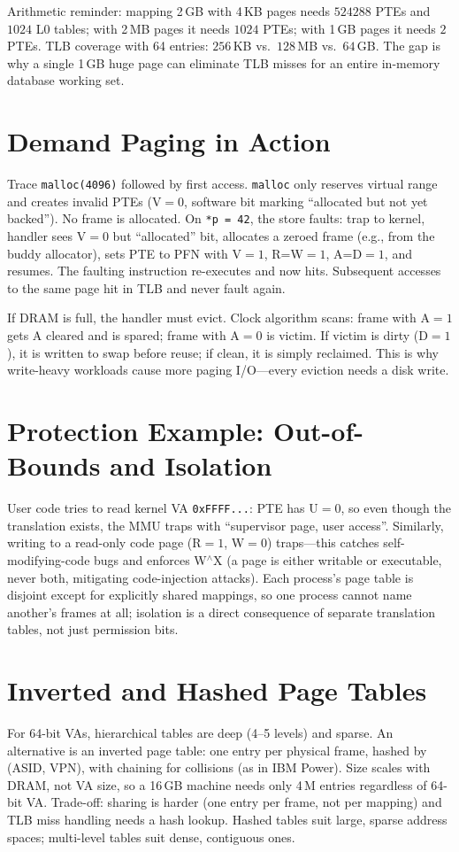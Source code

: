 Arithmetic reminder: mapping 2\,GB with 4\,KB pages needs $524288$ PTEs and $1024$ L0 tables; with 2\,MB pages it needs $1024$ PTEs; with 1\,GB pages it needs $2$ PTEs. TLB coverage with 64 entries: $256$\,KB vs.\ $128$\,MB vs.\ $64$\,GB. The gap is why a single 1\,GB huge page can eliminate TLB misses for an entire in-memory database working set.

\section{Demand Paging in Action}
Trace \texttt{malloc(4096)} followed by first access. \texttt{malloc} only reserves virtual range and creates invalid PTEs (V$=0$, software bit marking ``allocated but not yet backed''). No frame is allocated. On \texttt{*p = 42}, the store faults: trap to kernel, handler sees V$=0$ but ``allocated'' bit, allocates a zeroed frame (e.g., from the buddy allocator), sets PTE to PFN with V$=1$, R=W$=1$, A=D$=1$, and resumes. The faulting instruction re-executes and now hits. Subsequent accesses to the same page hit in TLB and never fault again.

If DRAM is full, the handler must evict. Clock algorithm scans: frame with A$=1$ gets A cleared and is spared; frame with A$=0$ is victim. If victim is dirty (D$=1$), it is written to swap before reuse; if clean, it is simply reclaimed. This is why write-heavy workloads cause more paging I/O---every eviction needs a disk write.
\section{Protection Example: Out-of-Bounds and Isolation}
User code tries to read kernel VA \texttt{0xFFFF...}: PTE has U$=0$, so even though the translation exists, the MMU traps with ``supervisor page, user access''. Similarly, writing to a read-only code page (R$=1$, W$=0$) traps---this catches self-modifying-code bugs and enforces W$^\wedge$X (a page is either writable or executable, never both, mitigating code-injection attacks). Each process's page table is disjoint except for explicitly shared mappings, so one process cannot name another's frames at all; isolation is a direct consequence of separate translation tables, not just permission bits.

\section{Inverted and Hashed Page Tables}
For 64-bit VAs, hierarchical tables are deep (4--5 levels) and sparse. An alternative is an inverted page table: one entry per physical frame, hashed by (ASID, VPN), with chaining for collisions (as in IBM Power). Size scales with DRAM, not VA size, so a 16\,GB machine needs only 4\,M entries regardless of 64-bit VA. Trade-off: sharing is harder (one entry per frame, not per mapping) and TLB miss handling needs a hash lookup. Hashed tables suit large, sparse address spaces; multi-level tables suit dense, contiguous ones.

